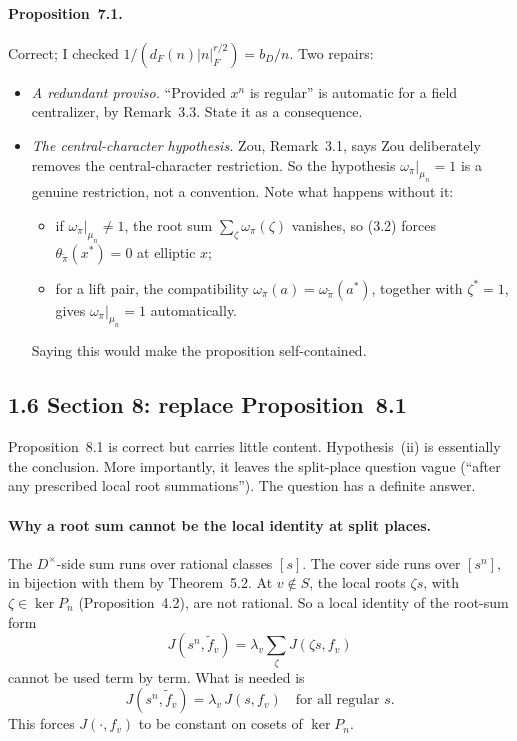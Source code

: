 \documentclass[11pt]{article}
\begin{document}
\paragraph{Proposition~7.1.} Correct; I checked
$1/(d_F(n)|n|_F^{r/2})=b_D/n$. Two repairs:
\begin{itemize}
\item \emph{A redundant proviso.} ``Provided $x^n$ is regular'' is
automatic for a field centralizer, by Remark~3.3. State it as a
consequence.
\item \emph{The central-character hypothesis.} Zou, Remark~3.1, says Zou
deliberately removes the central-character restriction. So the
hypothesis $\omega_\pi|_{\mu_n}=1$ is a genuine restriction, not a
convention. Note what happens without it:
\begin{itemize}
\item if $\omega_\pi|_{\mu_n}\ne1$, the root sum
$\sum_\zeta\omega_\pi(\zeta)$ vanishes, so (3.2) forces
$\theta_{\tilde\pi}(x^*)=0$ at elliptic $x$;
\item for a lift pair, the compatibility
$\omega_\pi(a)=\omega_{\tilde\pi}(a^*)$, together with $\zeta^*=1$,
gives $\omega_\pi|_{\mu_n}=1$ automatically.
\end{itemize}
Saying this would make the proposition self-contained.
\end{itemize}

\subsection*{1.6 Section 8: replace Proposition~8.1}
Proposition~8.1 is correct but carries little content. Hypothesis~(ii)
is essentially the conclusion. More importantly, it leaves the
split-place question vague (``after any prescribed local root
summations''). The question has a definite answer.

\paragraph{Why a root sum cannot be the local identity at split places.}
The $D^\times$-side sum runs over rational classes $[s]$. The cover side
runs over $[s^n]$, in bijection with them by Theorem~5.2. At $v\notin S$,
the local roots $\zeta s$, with $\zeta\in\ker P_n$ (Proposition~4.2), are
not rational. So a local identity of the root-sum form
\[
J(s^n,\tilde f_v)=\lambda_v\sum_\zeta J(\zeta s,f_v)
\]
cannot be used term by term. What is needed is
\[
J(s^n,\tilde f_v)=\lambda_v\,J(s,f_v)\quad\text{for all regular }s.
\]
This forces $J(\cdot,f_v)$ to be constant on cosets of $\ker P_n$.
\end{document}
